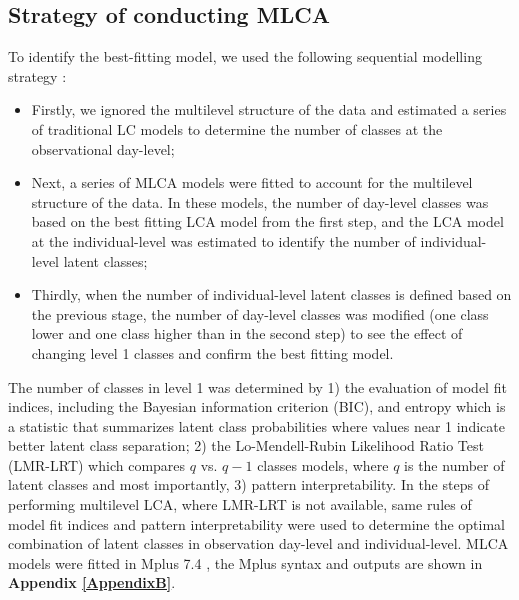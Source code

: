 \subsection{Strategy of conducting MLCA}\vspace{-0.3cm}

To identify the best-fitting model, we used the following sequential modelling strategy \parencite{henry2010multilevel}: 

\begin{itemize}
	\item Firstly, we ignored the multilevel structure of the data and estimated a series of traditional LC models to determine the number of classes at the observational day-level;
	\item Next, a series of MLCA models were fitted to account for the multilevel structure of the data. In these models, the number of day-level classes was based on the best fitting LCA model from the first step, and the LCA model at the individual-level was estimated to identify the number of individual-level latent classes;
	\item Thirdly, when the number of individual-level latent classes is defined based on the previous stage, the number of day-level classes was modified (one class lower and one class higher than in the second step) to see the effect of changing level 1 classes and confirm the best fitting model.
\end{itemize}

The number of classes in level 1 was determined by 1) the evaluation of model fit indices, including the Bayesian information criterion (BIC), and entropy which is a statistic that summarizes latent class probabilities where values near 1 indicate better latent class separation; 2) the Lo-Mendell-Rubin Likelihood Ratio Test (LMR-LRT) \parencite{lo2001testing, nylund2007deciding} which compares $q$ vs. $q-1$ classes models, where $q$ is the number of latent classes and most importantly, 3) pattern interpretability. In the steps of performing multilevel LCA, where LMR-LRT is not available, same rules of model fit indices and pattern interpretability were used to determine the optimal combination of latent classes in observation day-level and individual-level. MLCA models were fitted in Mplus 7.4 \parencite{muthen2005mplus}, the Mplus syntax and outputs are shown in \textbf{Appendix \ref{AppendixB}}. \vspace{-0.3cm}



